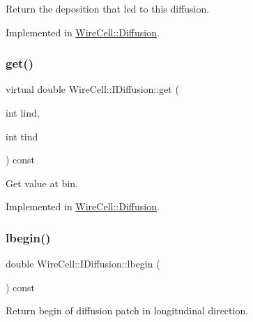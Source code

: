 Return the deposition that led to this diffusion. 



Implemented in \hyperlink{class_wire_cell_1_1_diffusion_a6d2cefc927cf2ae6c85587a7f579c01d}{Wire\+Cell\+::\+Diffusion}.

\mbox{\label{class_wire_cell_1_1_i_diffusion_ae37342e7b048d186c14fe86e81d706c5}} 
\subsubsection{\texorpdfstring{get()}{get()}}
{\footnotesize\ttfamily virtual double Wire\+Cell\+::\+I\+Diffusion\+::get (\begin{DoxyParamCaption}\item[{int}]{lind,  }\item[{int}]{tind }\end{DoxyParamCaption}) const\hspace{0.3cm}{\ttfamily [pure virtual]}}



Get value at bin. 



Implemented in \hyperlink{class_wire_cell_1_1_diffusion_a765cac5acd074254aef9782b37292c1a}{Wire\+Cell\+::\+Diffusion}.

\mbox{\label{class_wire_cell_1_1_i_diffusion_a554ef0f091287ae6e9f707a961f5a53c}} 
\subsubsection{\texorpdfstring{lbegin()}{lbegin()}}
{\footnotesize\ttfamily double Wire\+Cell\+::\+I\+Diffusion\+::lbegin (\begin{DoxyParamCaption}{ }\end{DoxyParamCaption}) const\hspace{0.3cm}{\ttfamily [inline]}}



Return begin of diffusion patch in longitudinal direction. 




